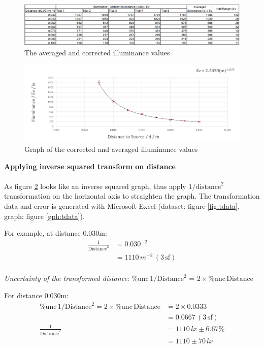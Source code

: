 \documentclass[a4paper,12pt]{article}
\newcommand{\relun}{\% \text{unc}\,}
\newcommand{\tsf}{\,\text{sf}}
\newcommand{\paragraphnl}[1]{\textbf{#1}\\\\}
\begin{document}
\begin{figure}[H]
    \centering
    \includegraphics[width=\textwidth]{assets/averagedata.png}
    \caption{The averaged and corrected illuminance values}
    \label{fig:average}
\end{figure}

\begin{figure}[H]
    \centering
    \includegraphics[width=\textwidth]{assets/averagegraph.png}
    \caption{Graph of the corrected and averaged illuminance values}
    \label{gph:average}
\end{figure}


\paragraphnl{Applying inverse squared transform on distance}
As figure \ref{gph:average} looks like an inverse squared graph, thus apply $1/{\text{distance}}^2$ transformation on the horizontal axis to straighten the graph. The transformation data and error is generated with Microsoft Excel (dataset: figure \ref{fig:tdata}, graph: figure \ref{gph:tdata}).

For example, at distance 0.030m:
\begin{align*}
 \frac{1}{\text{Distance}^2} &= 0.030 ^ {-2}\\
 &= 1110\,\si{m^{-2}}\, (3 \tsf)\\
\end{align*}

\textit{Uncertainty of the transformed distance}: $\relun 1/{\text{Distance}}^2$ = $2 \times \relun \text{Distance}$

For distance 0.030m:
\begin{align*}
 \relun 1/{\text{Distance}}^2 = 2 \times \relun \text{Distance} &= 2 \times 0.0333\\ &= 0.0667 \,(3 \tsf)\\
 \frac{1}{\text{Distance}^2} &= 1110\, \si{lx} \pm 6.67\%\\
 &= 1110 \pm 70 \,\si{lx}
\end{align*}
\end{document}
